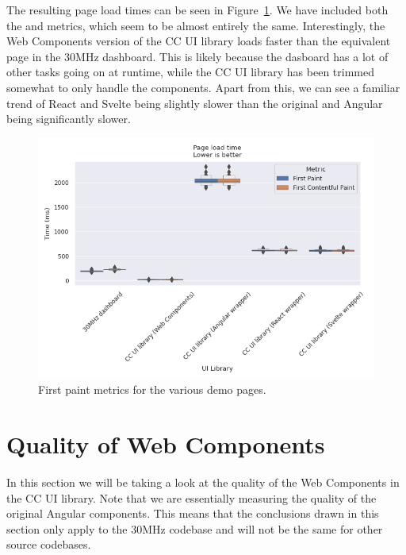 The resulting page load times can be seen in Figure~\ref{fig:results:first-paint}. We have included both the  and  metrics, which seem to be almost entirely the same. Interestingly, the Web Components version of the CC UI library loads faster than the equivalent page in the 30MHz dashboard. This is likely because the dasboard has a lot of other tasks going on at runtime, while the CC UI library has been trimmed somewhat to only handle the components. Apart from this, we can see a familiar trend of React and Svelte being slightly slower than the original and Angular being significantly slower.

\begin{figure}[h]
	\includegraphics[width=\columnwidth]{plots/first-contentful-paint.png}
	\caption{First paint metrics for the various demo pages.}
	\label{fig:results:first-paint}
	\centering
\end{figure}

\section{Quality of Web Components}
In this section we will be taking a look at the quality of the Web Components in the CC UI library. Note that we are essentially measuring the quality of the original Angular components. This means that the conclusions drawn in this section only apply to the 30MHz codebase and will not be the same for other source codebases.

